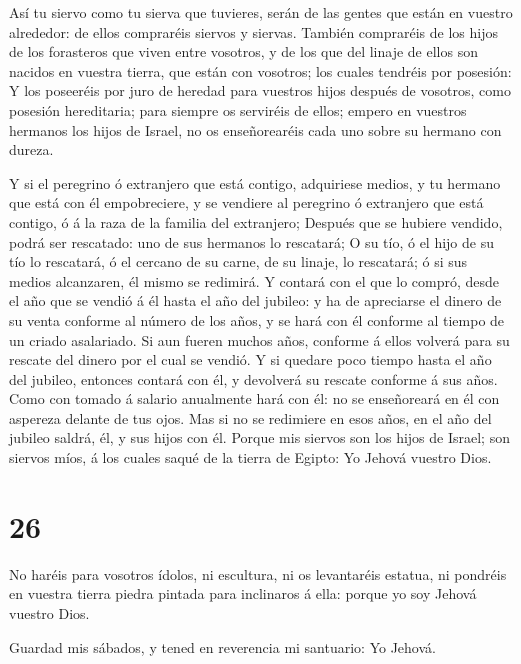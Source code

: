  Así tu siervo como tu sierva que tuvieres, serán de las
gentes que están en vuestro alrededor: de ellos compraréis siervos y
siervas.  También compraréis de los hijos de los forasteros
que viven entre vosotros, y de los que del linaje de ellos son nacidos
en vuestra tierra, que están con vosotros; los cuales tendréis por
posesión:  Y los poseeréis por juro de heredad para
vuestros hijos después de vosotros, como posesión hereditaria; para
siempre os serviréis de ellos; empero en vuestros hermanos los hijos de
Israel, no os enseñorearéis cada uno sobre su hermano con dureza.

 Y si el peregrino ó extranjero que está contigo,
adquiriese medios, y tu hermano que está con él empobreciere, y se
vendiere al peregrino ó extranjero que está contigo, ó á la raza de la
familia del extranjero;  Después que se hubiere vendido,
podrá ser rescatado: uno de sus hermanos lo rescatará;  O
su tío, ó el hijo de su tío lo rescatará, ó el cercano de su carne, de
su linaje, lo rescatará; ó si sus medios alcanzaren, él mismo se
redimirá.  Y contará con el que lo compró, desde el año que
se vendió á él hasta el año del jubileo: y ha de apreciarse el dinero de
su venta conforme al número de los años, y se hará con él conforme al
tiempo de un criado asalariado.  Si aun fueren muchos años,
conforme á ellos volverá para su rescate del dinero por el cual se
vendió.  Y si quedare poco tiempo hasta el año del jubileo,
entonces contará con él, y devolverá su rescate conforme á sus años.
 Como con tomado á salario anualmente hará con él: no se
enseñoreará en él con aspereza delante de tus ojos.  Mas si
no se redimiere en esos años, en el año del jubileo saldrá, él, y sus
hijos con él.  Porque mis siervos son los hijos de Israel;
son siervos míos, á los cuales saqué de la tierra de Egipto: Yo Jehová
vuestro Dios.

\hypertarget{section-25}{%
\section{26}\label{section-25}}

 No haréis para vosotros ídolos, ni escultura, ni os
levantaréis estatua, ni pondréis en vuestra tierra piedra pintada para
inclinaros á ella: porque yo soy Jehová vuestro Dios.

 Guardad mis sábados, y tened en reverencia mi santuario: Yo
Jehová.

